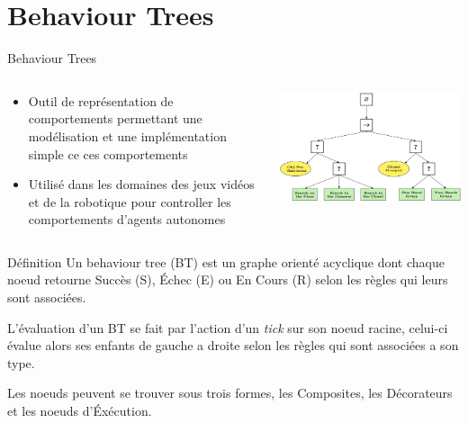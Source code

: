 \documentclass[presentation]{beamer}
\begin{document}
\section{Behaviour Trees}
\label{sec-2}
\begin{frame}[label=sec-2-0-1]{Behaviour Trees}
\begin{columns}
\begin{column}{0.5\textwidth}

\begin{itemize}
\item Outil de représentation de comportements permettant une modélisation et une implémentation simple ce ces comportements
\item Utilisé dans les domaines des jeux vidéos et de la robotique pour controller les comportements d'agents autonomes
\end{itemize}
\end{column}

\begin{column}{0.5\textwidth}
\includegraphics[width=.9\linewidth]{./img/BT_search_and_grasp.png}
\end{column}
\end{columns}
\end{frame}





\begin{frame}[label=sec-2-0-2]{Définition}
Un \alert{behaviour tree} (BT) est un graphe orienté acyclique dont chaque noeud retourne Succès (S), Échec (E) ou En Cours (R) selon les règles qui leurs sont associées.

L'évaluation d'un BT se fait par l'action d'un \emph{tick} sur son noeud racine, celui-ci évalue alors ses enfants de gauche a droite selon les règles qui sont associées a son type.

Les noeuds peuvent se trouver sous trois formes, les Composites, les Décorateurs et les noeuds d'Éxécution.
\end{frame}
\end{document}
